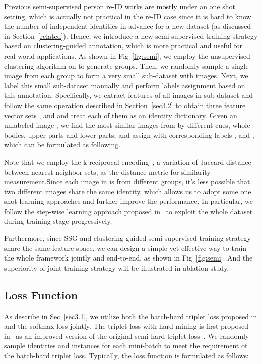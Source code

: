\documentclass[10pt,twocolumn,letterpaper]{article}
\newcommand{\re}{\textcolor{black}}
\begin{document}
Previous semi-supervised person re-ID works are \re{mostly} under an one shot setting, which is actually not practical in the re-ID case since it is hard to know the number of independent identities in advance for a new dataset (as discussed in Section~\ref{related}). Hence, we introduce a new semi-supervised training strategy based on clustering-guided annotation, which is more practical and useful for real-world applications. As shown in Fig~\ref{fig:semi}, we employ the unsupervised clustering algorithm on  to generate  groups. Then, we randomly sample a single image from each group to form a very small sub-dataset  with  images. Next, we label this small sub-dataset manually and perform labels assignment based on this annotation. Specifically, we extract features of all images in sub-dataset  and follow the same operation described in Section~\ref{sec3.2} to obtain three feature vector sets ,  and  and treat each of them as an identity dictionary. Given an unlabeled image , we find the most similar images from  by different cues, whole bodies, upper parts and lower parts, and assign  with corresponding labels ,  and , which can be formulated as following.


Note that we employ the k-reciprocal encoding~\cite{zhong2017re}, a variation of Jaccard distance between nearest neighbor sets, as the distance metric for similarity measurement.Since each image in  is from different groups, it's less possible that two different images share the same identity, which allows us to adopt some one shot learning approaches and further improve the performance. In particular, we follow the step-wise learning approach proposed in~\cite{wu2018exploit} to exploit the whole dataset during training stage progressively.

Furthermore, since SSG and clustering-guided semi-supervised training strategy share the same feature space, we can design a simple yet effective way to train the whole framework jointly and end-to-end, as shown in Fig~\ref{fig:semi}. And the superiority of joint training strategy will be illustrated in ablation study.




\subsection{Loss Function} \label{sec3.4}
 As describe in Sec~\ref{sec3.1}, we utilize both the batch-hard triplet loss proposed in \cite{hermans2017defense} and the softmax loss jointly.
The triplet loss with hard mining is first proposed in~\cite{hermans2017defense} as an improved version of the original semi-hard triplet loss~\cite{schroff2015facenet}. We randomly sample  identities and  instances for each mini-batch to meet the requirement of the batch-hard triplet loss. Typically, the loss function is formulated as follows:
\end{document}
